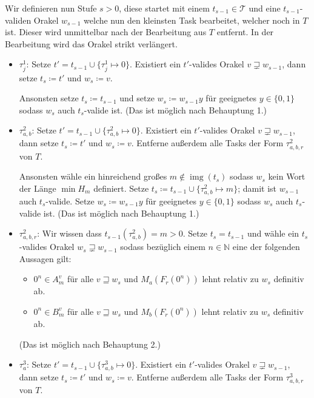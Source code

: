 \documentclass[nofonts]{uebung}
\DeclareMathOperator{\img}{img}
\begin{document}
Wir definieren nun Stufe $s>0$, diese startet mit einem $t_{s-1}\in\mathcal T$ und eine $t_{s-1}$-validen Orakel $w_{s-1}$ welche nun den kleinsten Task bearbeitet, welcher noch in $T$ ist. Dieser wird unmittelbar nach der Bearbeitung aus $T$ entfernt. In der Bearbeitung wird das Orakel strikt verlängert.
\begin{itemize}

    \item $\tau^1_j$: Setze $t'=t_{s-1}\cup\{\tau^1_j\mapsto 0\}$. Existiert ein $t'$-valides Orakel $v\sqsupsetneq w_{s-1}$, dann setze $t_s\coloneqq t'$ und $w_s\coloneqq v$.

        Ansonsten setze $t_s\coloneqq t_{s-1}$ und setze $w_s\coloneqq w_{s-1}y$ für geeignetes $y\in\{0,1\}$ sodass $w_s$ auch $t_s$-valide ist. (Das ist möglich nach Behauptung 1.)

    \item $\tau^2_{a,b}$: Setze $t'=t_{s-1}\cup\{\tau^2_{a,b}\mapsto 0\}$. Existiert ein $t'$-valides Orakel $v\sqsupsetneq w_{s-1}$, dann setze $t_s\coloneqq t'$ und $w_s\coloneqq v$. Entferne außerdem alle Tasks der Form $\tau^2_{a,b,r}$ von $T$.

        Ansonsten wähle ein hinreichend großes $m\not\in \img(t_s)$ sodass $w_s$ kein Wort der Länge $\min H_m$ definiert. Setze $t_s\coloneqq t_{s-1}\cup \{ \tau^2_{a,b}\mapsto m \}$; damit ist $w_{s-1}$ auch $t_s$-valide. Setze $w_s\coloneqq w_{s-1}y$ für geeignetes $y\in\{0,1\}$ sodass $w_s$ auch $t_s$-valide ist. (Das ist möglich nach Behauptung 1.)

    \item $\tau^2_{a,b,r}$: Wir wissen dass $t_{s-1}(\tau^2_{a,b})=m>0$. Setze $t_s=t_{s-1}$ und wähle ein $t_s$-valides Orakel $w_s\sqsupsetneq w_{s-1}$ sodass bezüglich einem $n\in\mathbb N$ eine der folgenden Aussagen gilt:
        \begin{itemize}[nosep,endpenalty=10000]
            \item $0^n\in A_m^v$ für alle $v\sqsupseteq w_s$ und $M_a(F_r(0^n))$ lehnt relativ zu $w_s$ definitiv ab.
            \item $0^n\in B_m^v$ für alle $v\sqsupseteq w_s$ und $M_b(F_r(0^n))$ lehnt relativ zu $w_s$ definitiv ab.
        \end{itemize} (Das ist möglich nach Behauptung 2.)

    \item $\tau^3_{a}$: Setze $t'=t_{s-1}\cup\{\tau^3_{a,b}\mapsto 0\}$. Existiert ein $t'$-valides Orakel $v\sqsupsetneq w_{s-1}$, dann setze $t_s\coloneqq t'$ und $w_s\coloneqq v$. Entferne außerdem alle Tasks der Form $\tau^3_{a,b,r}$ von $T$.


\end{itemize}
\end{document}
